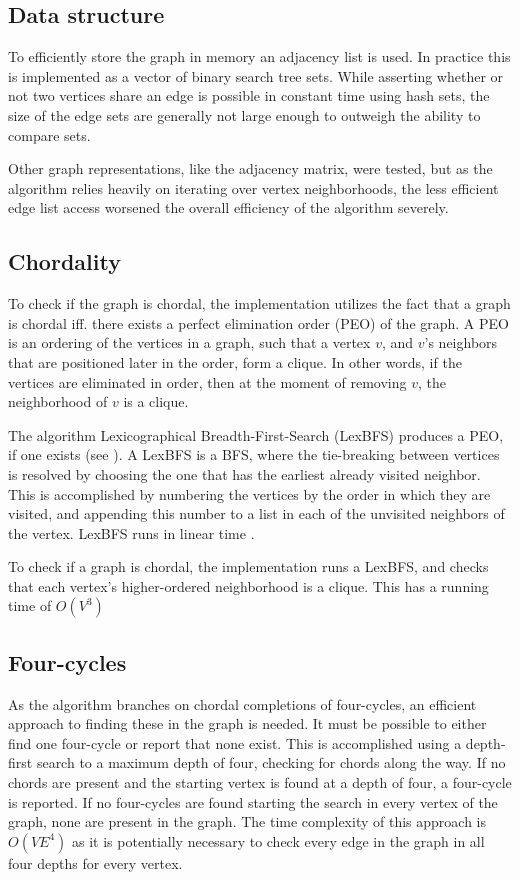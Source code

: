\documentclass{article}
\begin{document}
		\subsection{Data structure}
		To efficiently store the graph in memory an adjacency list is used.
		In practice this is implemented as a vector of binary search tree sets.
		While asserting whether or not two vertices share an edge is possible in constant time using hash sets, the size of the edge sets are generally not large enough to outweigh the ability to compare sets.

		Other graph representations, like the adjacency matrix, were tested, but as the algorithm relies heavily on iterating over vertex neighborhoods, the less efficient edge list access worsened the overall efficiency of the algorithm severely.

		\subsection{Chordality}
		To check if the graph is chordal, the implementation utilizes the fact that a graph is chordal iff. there exists a perfect elimination order (PEO) of the graph. 
		A PEO is an ordering of the vertices in a graph, such that a vertex $v$, and $v$'s neighbors that are positioned later in the order, form a clique.
		In other words, if the vertices are eliminated in order, then at the moment of removing $v$, the neighborhood of $v$ is a clique.

		The algorithm Lexicographical Breadth-First-Search (LexBFS) produces a PEO, if one exists (see \cite{separability-generalizes-diracs-theorem, algorithmic-aspects-of-vertex-elimination-on-directed-graphs}).
		A LexBFS is a BFS, where the tie-breaking between vertices is resolved by choosing the one that has the earliest already visited neighbor.
		This is accomplished by numbering the vertices by the order in which they are visited, and appending this number to a list in each of the unvisited neighbors of the vertex.
		LexBFS runs in linear time \cite{separability-generalizes-diracs-theorem}.

		To check if a graph is chordal, the implementation runs a LexBFS, and checks that each vertex's higher-ordered neighborhood is a clique.
		This has a running time of $O(V^3)$

		\subsection{Four-cycles}
		As the algorithm branches on chordal completions of four-cycles, an efficient approach to finding these in the graph is needed.
		It must be possible to either find one four-cycle or report that none exist.
		This is accomplished using a depth-first search to a maximum depth of four, checking for chords along the way.
		If no chords are present and the starting vertex is found at a depth of four, a four-cycle is reported.
		If no four-cycles are found starting the search in every vertex of the graph, none are present in the graph.
		The time complexity of this approach is $O(VE^4)$ as it is potentially necessary to check every edge in the graph in all four depths for every vertex.
\end{document}
